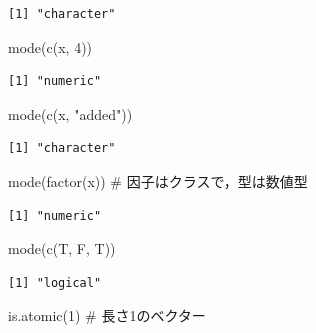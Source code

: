 \documentclass[
  letterpaper,
  DIV=11,
  numbers=noendperiod]{scrreprt}
\newenvironment{Shaded}{\begin{snugshade}}{\end{snugshade}}
\newcommand{\CommentTok}[1]{\textcolor[rgb]{0.37,0.37,0.37}{#1}}
\newcommand{\DecValTok}[1]{\textcolor[rgb]{0.68,0.00,0.00}{#1}}
\newcommand{\FunctionTok}[1]{\textcolor[rgb]{0.28,0.35,0.67}{#1}}
\newcommand{\NormalTok}[1]{\textcolor[rgb]{0.00,0.23,0.31}{#1}}
\newcommand{\StringTok}[1]{\textcolor[rgb]{0.13,0.47,0.30}{#1}}
\begin{document}
\begin{verbatim}
[1] "character"
\end{verbatim}

\begin{Shaded}
\begin{Highlighting}[]
\FunctionTok{mode}\NormalTok{(}\FunctionTok{c}\NormalTok{(x, }\DecValTok{4}\NormalTok{)) }
\end{Highlighting}
\end{Shaded}

\begin{verbatim}
[1] "numeric"
\end{verbatim}

\begin{Shaded}
\begin{Highlighting}[]
\FunctionTok{mode}\NormalTok{(}\FunctionTok{c}\NormalTok{(x, }\StringTok{"added"}\NormalTok{))}
\end{Highlighting}
\end{Shaded}

\begin{verbatim}
[1] "character"
\end{verbatim}

\begin{Shaded}
\begin{Highlighting}[]
\FunctionTok{mode}\NormalTok{(}\FunctionTok{factor}\NormalTok{(x)) }\CommentTok{\# 因子はクラスで，型は数値型}
\end{Highlighting}
\end{Shaded}

\begin{verbatim}
[1] "numeric"
\end{verbatim}

\begin{Shaded}
\begin{Highlighting}[]
\FunctionTok{mode}\NormalTok{(}\FunctionTok{c}\NormalTok{(T, F, T))}
\end{Highlighting}
\end{Shaded}

\begin{verbatim}
[1] "logical"
\end{verbatim}

\begin{Shaded}
\begin{Highlighting}[]
\FunctionTok{is.atomic}\NormalTok{(}\DecValTok{1}\NormalTok{) }\CommentTok{\# 長さ1のベクター}
\end{Highlighting}
\end{Shaded}
\end{document}
